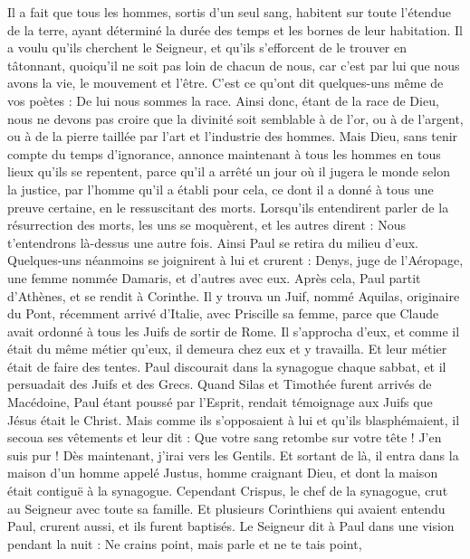 \begin{multicols}{2}
{{Il a fait que tous les hommes, sortis d'un seul sang, habitent sur toute l'étendue de la terre, ayant déterminé la durée des temps et les bornes de leur habitation.
Il a voulu qu'ils cherchent le Seigneur, et qu'ils s'efforcent de le trouver en tâtonnant, quoiqu'il ne soit pas loin de chacun de nous,
car c'est par lui que nous avons la vie, le mouvement et l'être. C'est ce qu'ont dit quelques-uns même de vos poètes : De lui nous sommes la race.
Ainsi donc, étant de la race de Dieu, nous ne devons pas croire que la divinité soit semblable à de l'or, ou à de l'argent, ou à de la pierre taillée par l'art et l'industrie des hommes.
Mais Dieu, sans tenir compte du temps d'ignorance, annonce maintenant à tous les hommes en tous lieux qu'ils se repentent,
parce qu'il a arrêté un jour où il jugera le monde selon la justice, par l'homme qu'il a établi pour cela, ce dont il a donné à tous une preuve certaine, en le ressuscitant des morts.
Lorsqu'ils entendirent parler de la résurrection des morts, les uns se moquèrent, et les autres dirent : Nous t'entendrons là-dessus une autre fois.
Ainsi Paul se retira du milieu d'eux.
Quelques-uns néanmoins se joignirent à lui et crurent : Denys, juge de l'Aéropage, une femme nommée Damaris, et d'autres avec eux.
\VerseOne{}Après cela, Paul partit d'Athènes, et se rendit à Corinthe.
Il y trouva un Juif, nommé Aquilas, originaire du Pont, récemment arrivé d'Italie, avec Priscille sa femme, parce que Claude avait ordonné à tous les Juifs de sortir de Rome. Il s'approcha d'eux,
et comme il était du même métier qu'eux, il demeura chez eux et y travailla. Et leur métier était de faire des tentes.
Paul discourait dans la synagogue chaque sabbat, et il persuadait des Juifs et des Grecs.
Quand Silas et Timothée furent arrivés de Macédoine, Paul étant poussé par l'Esprit, rendait témoignage aux Juifs que Jésus était le Christ.
Mais comme ils s'opposaient à lui et qu'ils blasphémaient, il secoua ses vêtements et leur dit : Que votre sang retombe sur votre tête ! J'en suis pur ! Dès maintenant, j'irai vers les Gentils.
Et sortant de là, il entra dans la maison d'un homme appelé Justus, homme craignant Dieu, et dont la maison était contiguë à la synagogue.
Cependant Crispus, le chef de la synagogue, crut au Seigneur avec toute sa famille. Et plusieurs Corinthiens qui avaient entendu Paul, crurent aussi, et ils furent baptisés.
Le Seigneur dit à Paul dans une vision pendant la nuit : Ne crains point, mais parle et ne te tais point,
}}
\end{multicols}
